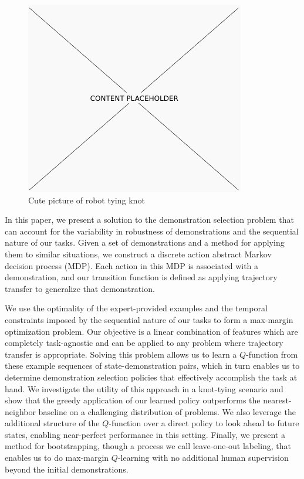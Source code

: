 \begin{figure}[t]
  \centering
    \includegraphics[width=0.9\linewidth]{figures/placeholder.png}
  \caption{Cute picture of robot tying knot}
  \label{fig:frontfig}
\end{figure}

In this paper, we present a solution to the demonstration selection problem that can account for the variability in robustness of demonstrations and the sequential nature of our tasks.
Given a set of demonstrations and a method for applying them to similar situations, we construct a discrete action abstract Markov decision process (MDP).
Each action in this MDP is associated with a demonstration, and our transition function is defined as applying trajectory transfer to generalize that demonstration.

We use the optimality of the expert-provided examples and the temporal constraints imposed by the sequential nature of our tasks to form a max-margin optimization problem.
Our objective is a linear combination of features which are completely task-agnostic and can be applied to any problem where trajectory transfer is appropriate. 
Solving this problem allows us to learn a $Q$-function from these example sequences of state-demonstration pairs, which in turn enables us to determine demonstration selection policies that effectively accomplish the task at hand.
We investigate the utility of this approach in a knot-tying scenario and show that the greedy application of our learned policy outperforms the nearest-neighbor baseline on a challenging distribution of problems. 
We also leverage the additional structure of the $Q$-function over a direct policy to look ahead to future states, enabling near-perfect performance in this setting.
Finally, we present a method for bootstrapping, though a process we call leave-one-out labeling, that enables us to do max-margin $Q$-learning with no additional human supervision beyond the initial demonstrations.

